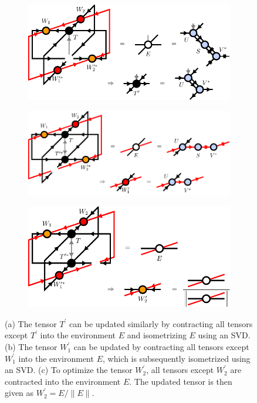 \begin{figure}
	\centering
	\begin{subfigure}[c]{0.85\textwidth}
		\includegraphics[scale=1]{figures/tikz/disoTPS/yang_baxter_move_iterative/yang_baxter_move_iterative_b.pdf}
		\caption{}\label{fig:YB_move_iterate_polar_optimize_T}
	\end{subfigure}
	\begin{subfigure}[c]{0.85\textwidth}
		\includegraphics[scale=1]{figures/tikz/disoTPS/yang_baxter_move_iterative/yang_baxter_move_iterative_c.pdf}
		\caption{}\label{fig:YB_move_iterate_polar_optimize_W1}
	\end{subfigure}
	\begin{subfigure}[c]{0.85\textwidth}
		\includegraphics[scale=1]{figures/tikz/disoTPS/yang_baxter_move_iterative/yang_baxter_move_iterative_d.pdf}
		\caption{}\label{fig:YB_move_iterate_polar_optimize_W2}
	\end{subfigure}%
	\caption{(a) The tensor $T^\prime$ can be updated similarly by contracting all tensors except $T^\prime$ into the environment $E$ and isometrizing $E$ using an SVD. (b) The tensor $W_1^\prime$ can be updated by contracting all tensors except $W_1^\prime$ into the environment $E$, which is subsequently isometrized using an SVD. (c) To optimize the tensor $W_2^\prime$, all tensors except $W_2^\prime$ are contracted into the environment $E$. The updated tensor is then given as $W_2^\prime = E/\lVert E\rVert$.}
	\label{fig:YB_move_iterate_polar}
\end{figure}